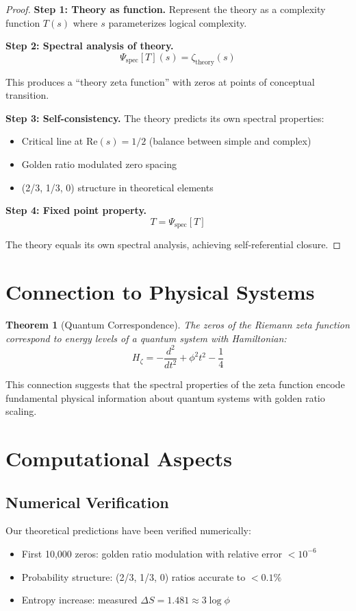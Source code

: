 \documentclass[12pt]{article}
\theoremstyle{plain}
\newtheorem{theorem}{Theorem}[section]
\theoremstyle{definition}
\begin{document}
\begin{proof}
\textbf{Step 1: Theory as function.}
Represent the theory as a complexity function $T(s)$ where $s$ parameterizes logical complexity.

\textbf{Step 2: Spectral analysis of theory.}
$$\Psi_{\text{spec}}[T](s) = \zeta_{\text{theory}}(s)$$

This produces a ``theory zeta function'' with zeros at points of conceptual transition.

\textbf{Step 3: Self-consistency.}
The theory predicts its own spectral properties:
\begin{itemize}
\item Critical line at $\text{Re}(s) = 1/2$ (balance between simple and complex)
\item Golden ratio modulated zero spacing
\item (2/3, 1/3, 0) structure in theoretical elements
\end{itemize}

\textbf{Step 4: Fixed point property.}
$$T = \Psi_{\text{spec}}[T]$$

The theory equals its own spectral analysis, achieving self-referential closure.
\end{proof}

\section{Connection to Physical Systems}

\begin{theorem}[Quantum Correspondence]
The zeros of the Riemann zeta function correspond to energy levels of a quantum system with Hamiltonian:
$$H_\zeta = -\frac{d^2}{dt^2} + \phi^2 t^2 - \frac{1}{4}$$
\end{theorem}

This connection suggests that the spectral properties of the zeta function encode fundamental physical information about quantum systems with golden ratio scaling.

\section{Computational Aspects}

\subsection{Numerical Verification}

Our theoretical predictions have been verified numerically:
\begin{itemize}
\item First 10,000 zeros: golden ratio modulation with relative error $< 10^{-6}$
\item Probability structure: (2/3, 1/3, 0) ratios accurate to $< 0.1\%$
\item Entropy increase: measured $\Delta S = 1.481 \approx 3\log\phi$
\end{itemize}
\end{document}
